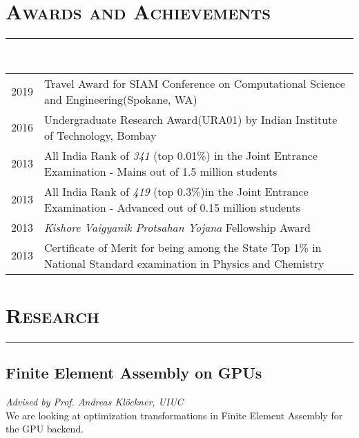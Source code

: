 \documentclass[letterpaper, 12pt]{article}
\begin{document}


\section*{\Large\textsc{Awards and Achievements}}
\vspace{-4ex}
\rule{\textwidth}{0.1ex}
\vspace{1ex}\\
\begin{tabular}{p{} p{}}
2019    &   Travel Award for SIAM Conference on Computational Science and Engineering(Spokane, WA) \vspace{1ex}\\
2016    &   Undergraduate Research Award(URA01) by Indian Institute of Technology, Bombay \vspace{1ex}\\
2013    &   All India Rank of \textit{341} (top 0.01\%) in the Joint Entrance Examination - Mains out of 1.5 million students \vspace{1ex} \\
2013    &   All India Rank of \textit{419} (top 0.3\%)in the Joint Entrance Examination - Advanced out of 0.15 million students\vspace{1ex} \\
2013    &   \textit{Kishore Vaigyanik Protsahan Yojana} Fellowship Award\vspace{1ex} \\
2013    &   Certificate of Merit for being among the State Top 1\% in National Standard examination in Physics and Chemistry \\
\end{tabular} 



\pagebreak

\section*{\Large\textsc{Research}}
\vspace{-4ex}
\rule{\textwidth}{0.1ex}


\subsection*{Finite Element Assembly on GPUs}
\vspace{-1ex}
\small \textit{Advised by Prof. Andreas Kl\"{o}ckner, UIUC}\\
We are looking at optimization transformations in Finite
Element Assembly for the GPU backend.
\end{document}
